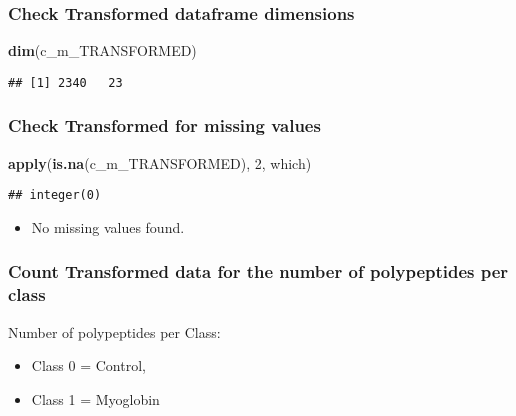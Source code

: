 \documentclass[]{article}
\newenvironment{Shaded}{\begin{snugshade}}{\end{snugshade}}
\newcommand{\DecValTok}[1]{\textcolor[rgb]{0.00,0.00,0.81}{#1}}
\newcommand{\KeywordTok}[1]{\textcolor[rgb]{0.13,0.29,0.53}{\textbf{#1}}}
\newcommand{\NormalTok}[1]{#1}
\providecommand{\tightlist}{%
  \setlength{\itemsep}{0pt}\setlength{\parskip}{0pt}}
\begin{document}
\hypertarget{check-transformed-dataframe-dimensions}{%
\subsubsection{Check Transformed dataframe
dimensions}\label{check-transformed-dataframe-dimensions}}

\begin{Shaded}
\begin{Highlighting}[]
\KeywordTok{dim}\NormalTok{(c_m_TRANSFORMED)}
\end{Highlighting}
\end{Shaded}

\begin{verbatim}
## [1] 2340   23
\end{verbatim}

\hypertarget{check-transformed-for-missing-values}{%
\subsubsection{Check Transformed for missing
values}\label{check-transformed-for-missing-values}}

\begin{Shaded}
\begin{Highlighting}[]
\KeywordTok{apply}\NormalTok{(}\KeywordTok{is.na}\NormalTok{(c_m_TRANSFORMED), }\DecValTok{2}\NormalTok{, which)}
\end{Highlighting}
\end{Shaded}

\begin{verbatim}
## integer(0)
\end{verbatim}

\begin{itemize}
\tightlist
\item
  No missing values found.
\end{itemize}

\hypertarget{count-transformed-data-for-the-number-of-polypeptides-per-class}{%
\subsubsection{Count Transformed data for the number of polypeptides per
class}\label{count-transformed-data-for-the-number-of-polypeptides-per-class}}

Number of polypeptides per Class:

\begin{itemize}
\tightlist
\item
  Class 0 = Control,
\item
  Class 1 = Myoglobin
\end{itemize}
\end{document}
